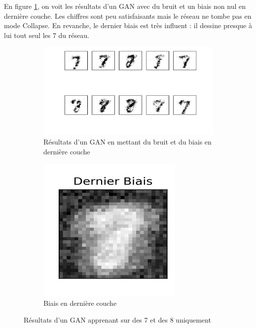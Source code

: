 En figure \ref{fig:resultat_gan_bb}, on voit les résultats d'un GAN avec du bruit et un biais non nul en dernière couche. Les chiffres sont peu satisfaisants mais le réseau ne tombe pas en mode Collapse. En revanche, le dernier biais est très influent : il dessine presque à lui tout seul les 7 du réseau.
\begin{figure}[h!]
  \centering
  \begin{subfigure}[b]{.7\linewidth}
    \includegraphics[width=\linewidth]{fig/resultatganbetb.png}
    \caption{Résultats d'un GAN en mettant du bruit et du biais en dernière couche}
  \end{subfigure}
  \quad
  \begin{subfigure}[b]{.2\linewidth}
    \includegraphics[width=\linewidth]{fig/resultatganbetbdernierbiais.jpg}
    \caption{Biais en dernière couche}
  \end{subfigure}
  \caption{Résultats d'un GAN apprenant sur des 7 et des 8 uniquement}
  \label{fig:resultat_gan_bb}
\end{figure}

